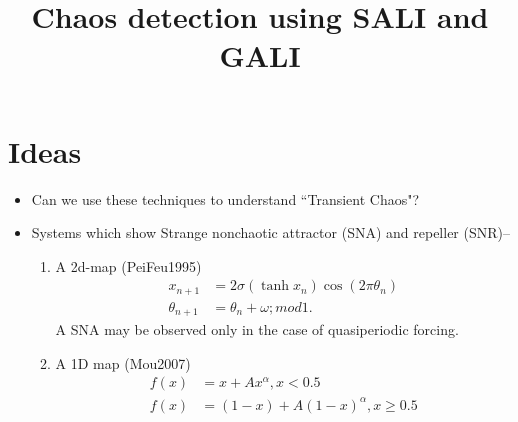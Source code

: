 \documentclass[paper=a4, fontsize=12pt]{scrartcl} %
\date{}
\date{}
\author{}
\title{Chaos detection using SALI and GALI}
\begin{document}
    \maketitle
\section*{Ideas}
\begin{itemize}
    \item Can we use these techniques to understand  ``Transient Chaos"?
    \item  Systems which show Strange nonchaotic attractor (SNA) 
    and repeller (SNR)--
    \begin{enumerate}
        \item A 2d-map (PeiFeu1995) 
        \begin{align}
        x_{n+1} &= 2\sigma(\tanh x_n)\cos(2\pi\theta_n)\\
        \theta_{n+1} &= \theta_n + \omega; mod 1.
        \end{align}
        A SNA may be observed only in the case of quasiperiodic forcing.
        \item A 1D map (Mou2007)
        \begin{align}
        f(x) &= x + Ax^\alpha, x < 0.5 \\
        f(x) &= (1-x) + A(1-x)^\alpha, x \geq 0.5
        \end{align}
    \end{enumerate}
\end{itemize}
\end{document}

